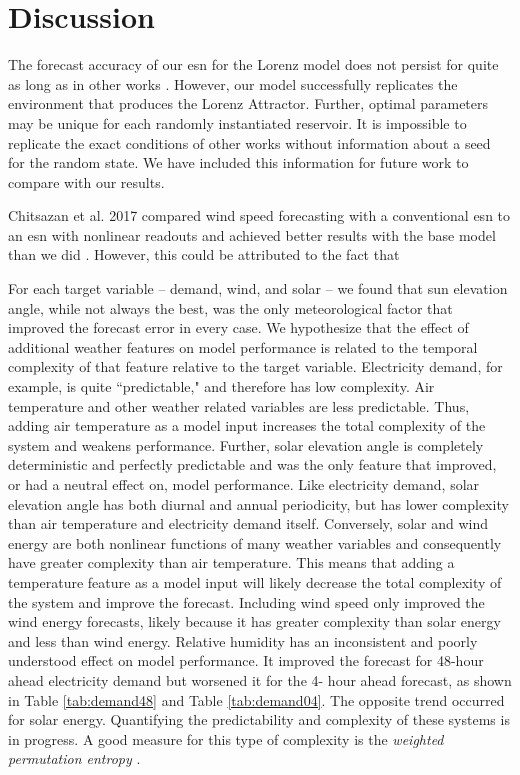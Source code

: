 \section{Discussion}

The forecast accuracy of our \gls{esn} for the Lorenz model does not persist
for quite as long as in other works \cite{pathak_using_2017}. However, our
model successfully replicates the environment that produces the Lorenz
Attractor. Further, optimal parameters may be unique for each randomly
instantiated reservoir. It is impossible to replicate the exact conditions of
other works without information about a seed for the random state. We have
included this information for future work to compare with our results.

Chitsazan et al. 2017 compared wind speed forecasting with a conventional
\gls{esn} to an \gls{esn} with nonlinear readouts and achieved better results
with the base model than we did \cite{chitsazan_wind_2017}. However, this could be attributed to the fact that

For each target variable -- demand, wind, and solar -- we found that sun
elevation angle, while not always the best, was the only meteorological factor
that improved the forecast error in every case. We hypothesize that the effect
of additional weather features on model performance is related to the temporal
complexity of that feature relative to the target variable. Electricity demand,
for example, is quite ``predictable," and therefore has low complexity. Air
temperature and other weather related variables are less predictable. Thus,
adding air temperature as a model input increases the total complexity of the
system and weakens performance. Further, solar elevation angle is completely
deterministic and perfectly predictable and was the only feature that improved,
or had a neutral effect on, model performance. Like electricity demand, solar
elevation angle has both diurnal and annual periodicity, but has lower
complexity than air temperature and electricity demand itself.
Conversely, solar and wind energy are both nonlinear functions of many weather
variables and consequently have greater complexity than air temperature. This
means that adding a temperature feature as a model input will likely decrease
the total complexity of the system and improve the forecast. Including wind
speed only improved the wind energy forecasts, likely because it has greater
complexity than solar energy and less than wind energy. Relative humidity has
an inconsistent and poorly understood effect on model performance. It improved
the forecast for 48-hour ahead electricity demand but worsened it for the 4-
hour ahead forecast, as shown in Table \ref{tab:demand48} and Table \ref{tab:demand04}. The opposite trend occurred for solar energy.
Quantifying the predictability and complexity of these systems is in progress.
A good measure for this type of complexity is the \textit{weighted permutation
entropy}
\cite{fadlallah_weighted-permutation_2013,garland_model-free_2014, pennekamp_intrinsic_2019}.

